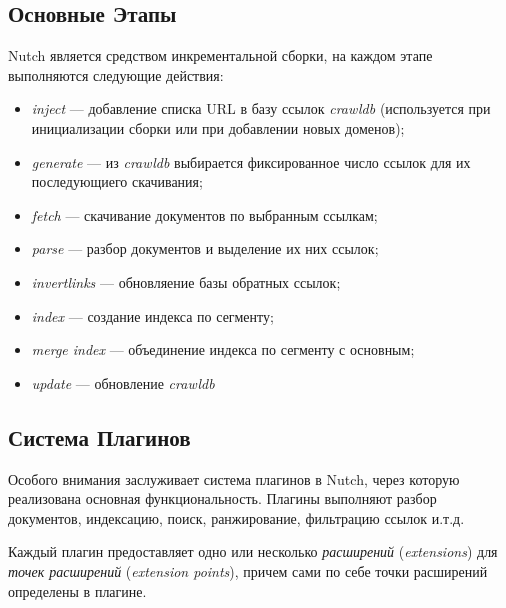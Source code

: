 \subsection{Основные Этапы}
Nutch является средством инкрементальной сборки, на каждом этапе выполняются следующие действия:
\begin{itemize}
 \item \textit{inject} --- добавление списка URL в базу ссылок \textit{crawldb} (используется при инициализации сборки или при добавлении новых доменов);
 \item \textit{generate} --- из \textit{crawldb} выбирается фиксированное число ссылок для их последующиего скачивания;
 \item \textit{fetch} --- скачивание документов по выбранным ссылкам;
 \item \textit{parse} --- разбор документов и выделение их них ссылок;
 \item \textit{invertlinks} --- обновляение базы обратных ссылок;
 \item \textit{index} --- создание индекса по сегменту;
 \item \textit{merge index} --- объединение индекса по сегменту с основным;
 \item \textit{update} --- обновление \textit{crawldb}
\end{itemize}

\subsection{Система Плагинов}
Особого внимания заслуживает система плагинов в Nutch, через которую реализована основная функциональность. Плагины выполняют разбор документов, индексацию, поиск, ранжирование, фильтрацию ссылок и.т.д.

Каждый плагин предоставляет одно или несколько \textit{расширений} (\textit{extensions}) для \textit{точек расширений} (\textit{extension points}), причем сами по себе точки расширений определены в плагине.
